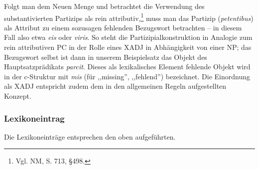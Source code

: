\documentclass[12pt,a4paper]{article}
\begin{document}
Folgt man dem Neuen Menge und betrachtet die Verwendung des substantivierten Partizips als rein attributiv,\footnote{Vgl. NM, S. 713, §498.} muss man das Partizip (\textit{petentibus}) als Attribut zu einem sozusagen fehlenden Bezugswort betrachten -- in diesem Fall also etwa \textit{eis} oder \textit{viris}. So steht die Partizipialkonstruktion in Analogie zum rein attributiven PC in der Rolle eines XADJ in Abhängigkeit von einer NP; das Bezugswort selbst ist dann in unserem Beispielsatz das Objekt des Hauptsatzprädikats \textit{parcit}. Dieses als lexikalisches Element fehlende Objekt wird in der c-Struktur mit \textit{mis} (für ,,missing'', ,,fehlend'') bezeichnet.  
Die Einordnung als XADJ entspricht zudem dem in den allgemeinen Regeln aufgestellten Konzept.

\subsubsection{Lexikoneintrag}
Die Lexikoneinträge entsprechen den oben aufgeführten.
\end{document}
